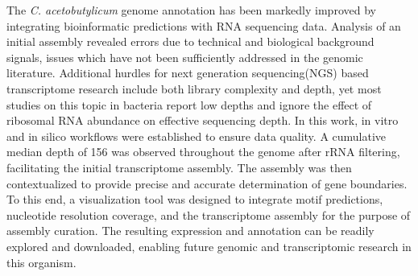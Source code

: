 

The {\it C. acetobutylicum} genome annotation has been markedly improved by integrating bioinformatic predictions with RNA sequencing data. Analysis of an initial assembly revealed errors due to technical and biological background signals, issues which have not been sufficiently addressed in the genomic literature. Additional hurdles for next generation sequencing(NGS) based transcriptome research include both library complexity and depth, yet most studies on this topic in bacteria report low depths and ignore the effect of ribosomal RNA abundance on effective sequencing depth. In this work, in vitro and in silico workflows were established to ensure data quality. A cumulative median depth of 156 was observed throughout the genome after rRNA filtering, facilitating the initial transcriptome assembly. The assembly was then contextualized to provide precise and accurate determination of gene boundaries. To this end, a visualization tool was designed to integrate motif predictions, nucleotide resolution coverage, and the transcriptome assembly for the purpose of assembly curation. The resulting expression and annotation can be readily explored and downloaded, enabling future genomic and transcriptomic research in this organism.

